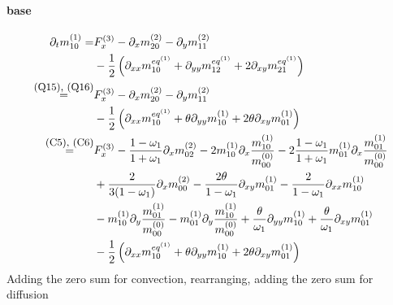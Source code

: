 \documentclass{article}
\begin{document}
  \paragraph{base}
  \begin{equation*}
    \begin{aligned}
    \partial_t m_{10}^{(1)}
      =&
      F_x^{(3)}
      - \partial_x m_{20}^{(2)} - \partial_y m_{11}^{(2)} \\
      &
      - \frac{1}{2} \left(\partial_{xx} m_{10}^{eq^{(1)}} + \partial_{yy} m_{12}^{eq^{(1)}} + 2\partial_{xy} m_{21}^{eq^{(1)}}\right)
     \\ \overset{\text{\small(Q15), (Q16)}}{=} &
     F_x^{(3)}
     - \partial_x m_{20}^{(2)} - \partial_y m_{11}^{(2)} \\
     &
     - \frac{1}{2} \left(\partial_{xx} m_{10}^{eq^{(1)}} + \theta\partial_{yy} m_{10}^{(1)} + 2\theta\partial_{xy} m_{01}^{(1)}\right)
     \\ \overset{\text{\small(C5), (C6)}}{=} &
     F_x^{(3)}
     - \frac{1-\omega_1}{1+\omega_1} \partial_x m_{02}^{(2)}
     - 2 m_{10}^{(1)} \partial_x \frac{ m_{10}^{(1)} }{m_{00}^{(0)}}
     - 2 \frac{1-\omega_1}{1+\omega_1} m_{01}^{(1)}\partial_x\frac{m_{01}^{(1)}}{m_{00}^{(0)}}
     \\&
     + \frac{ 2}{3(1-\omega_1)} \partial_x m_{00}^{(2)}
     - \frac{2\theta}{1-\omega_1}\partial_{xy} m_{01}^{(1)}
     - \frac{2}{1-\omega_1}\partial_{xx} m_{10}^{(1)}
     \\&
     -m_{10}^{(1)}\partial_y \frac{ m_{01}^{(1)}}{m_{00}^{(0)}}
     -m_{01}^{(1)}\partial_y \frac{ m_{10}^{(1)}}{m_{00}^{(0)}}
     + \frac{\theta}{\omega_1}\partial_{yy} m_{10}^{(1)}
     + \frac{\theta}{\omega_1}\partial_{xy} m_{01}^{(1)}
     \\&
     - \frac{1}{2} \left(\partial_{xx} m_{10}^{eq^{(1)}} + \theta\partial_{yy} m_{10}^{(1)} + 2\theta\partial_{xy} m_{01}^{(1)}\right)
    \end{aligned}
  \end{equation*}
Adding the zero sum for convection, rearranging, adding the zero sum for diffusion
\end{document}
